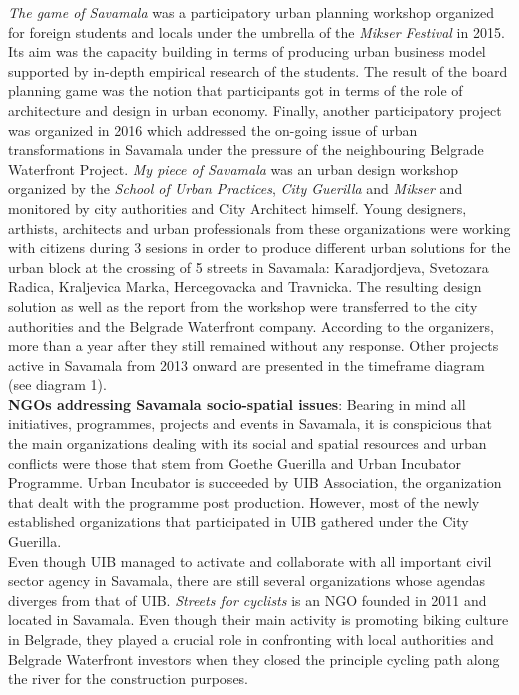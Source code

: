\documentclass[11pt]{report}
\begin{document}
\textit{The game of Savamala} was a participatory urban planning workshop organized for foreign students and locals under the umbrella of the \textit{Mikser Festival} in 2015. Its aim was the capacity building in terms of producing urban business model supported by in-depth empirical research of the students. The result of the board planning game was the notion that participants got in terms of the role of architecture and design in urban economy.
Finally, another participatory project was organized in 2016 which addressed the on-going issue of urban transformations in Savamala under the pressure of the neighbouring Belgrade Waterfront Project. \textit{My piece of Savamala}  was an urban design workshop organized by the \textit{School of Urban Practices}, \textit{City Guerilla} and \textit{Mikser} and monitored by city authorities and City Architect himself. Young designers, arthists, architects and urban professionals from these organizations were working with citizens during 3 sesions in order to produce different urban solutions for the urban block at the crossing of 5 streets in Savamala: Karadjordjeva, Svetozara Radica, Kraljevica Marka, Hercegovacka and Travnicka. The resulting design solution as well as the report from the workshop were transferred to the city authorities and the Belgrade Waterfront company. According to the organizers, more than a year after they still remained without any response.
Other projects active in Savamala from 2013 onward are presented in the timeframe diagram (see diagram 1).
\\
\textbf{NGOs addressing Savamala socio-spatial issues}:
Bearing in mind all initiatives, programmes, projects and events in Savamala, it is conspicious that the main organizations dealing with its social and spatial resources and urban conflicts were those that stem from Goethe Guerilla and Urban Incubator Programme. Urban Incubator is succeeded by UIB  Association, the organization that dealt with the programme post production. However, most of the newly established organizations that participated in UIB gathered under the City Guerilla.
\\
Even though UIB managed to activate and collaborate with all important civil sector agency in Savamala, there are still several organizations whose agendas diverges from that of UIB.
\textit{Streets for cyclists} is an NGO founded in 2011 and located in Savamala. Even though their main activity is promoting biking culture in Belgrade, they played a crucial role in confronting with local authorities and Belgrade Waterfront investors when they closed the principle cycling path along the river for the construction purposes.
\end{document}
